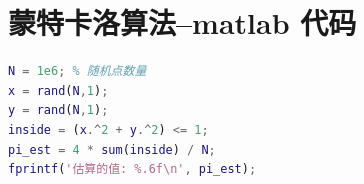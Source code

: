 \section{蒙特卡洛算法--matlab 代码}

\begin{lstlisting}[language=matlab]
% 蒙特卡洛估算圆周率
N = 1e6; % 随机点数量
x = rand(N,1);
y = rand(N,1);
inside = (x.^2 + y.^2) <= 1;
pi_est = 4 * sum(inside) / N;
fprintf('估算的值: %.6f\n', pi_est);
\end{lstlisting}
